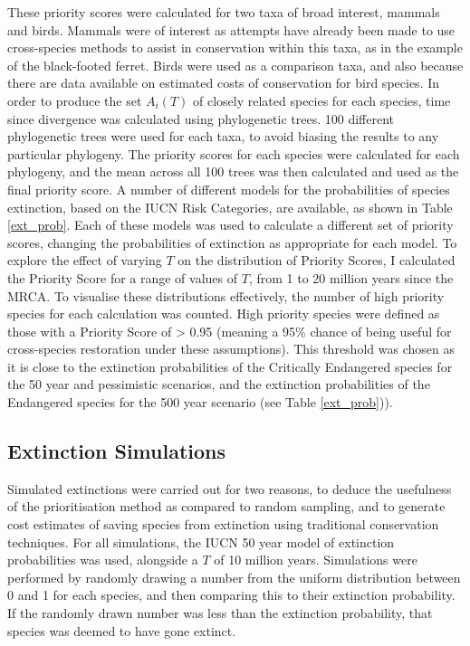 \documentclass[10pt]{article}
\begin{document}
	These priority scores were calculated for two taxa of broad interest,
	mammals and birds. Mammals were of interest as attempts have already been made to use
	cross-species methods to assist in conservation within this taxa, as in the example of the
	black-footed ferret. Birds were used as a comparison taxa, and also because there are data
	available on estimated costs of conservation for bird species. In order to produce the set $A_i(T)$
	of closely related species for each species, time since divergence was calculated using phylogenetic
	trees. 100 different phylogenetic trees were used for each taxa, to avoid biasing the results to any
	particular phylogeny. %
	The priority scores for each species were calculated for each phylogeny,
	and the mean across all 100 trees was then calculated and used as the final
	priority score. A number of different models for the probabilities of species
	extinction, based on the IUCN Risk Categories, are available, as shown in Table \ref{ext_prob}.
	Each of these models was used to
	calculate a different set of priority scores, changing the probabilities of extinction as
	appropriate for each model. To explore the effect of varying $T$ on the distribution of Priority
	Scores, I calculated the Priority Score for a range of values of $T$, from 1
	to 20 million years since the MRCA. To visualise these distributions effectively,
	the number of high priority species for each calculation was counted. High priority
	species were defined as those with a Priority Score of > 0.95 (meaning a 95\%
	chance of being useful for cross-species restoration under these assumptions).
	This threshold was chosen as it is close to the extinction probabilities
	of the Critically Endangered species for the 50 year and pessimistic scenarios,
	and the extinction probabilities of the Endangered species for the 500 year
	scenario (see Table \ref{ext_prob})).
	
	\subsection{Extinction Simulations}\label{sim_methods}
	Simulated extinctions were carried out for two reasons, to deduce the usefulness of the prioritisation
	method as compared to random sampling, and to generate cost estimates of saving species from
	extinction using traditional conservation techniques. For all simulations, the IUCN 50
	year model of extinction probabilities \citep{mooersConvertingEndangeredSpecies2008} was used, alongside
	a $T$ of 10 million years. Simulations were performed by randomly drawing a number from the 
	uniform distribution between 0 and 1 for each species,
	and then comparing this to their extinction probability. If the randomly drawn number 
	was less than the extinction probability, that species was deemed to have gone extinct.
	
\end{document}
